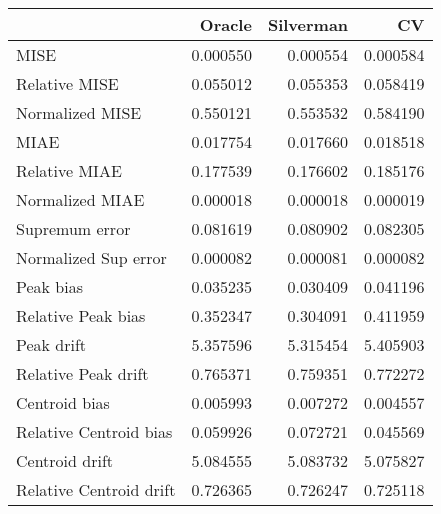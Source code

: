 \begin{tabular}{lrrr}
  \toprule
 & Oracle & Silverman & CV \\ 
  \midrule
MISE & 0.000550 & 0.000554 & 0.000584 \\ 
  Relative MISE & 0.055012 & 0.055353 & 0.058419 \\ 
  Normalized MISE & 0.550121 & 0.553532 & 0.584190 \\ 
  MIAE & 0.017754 & 0.017660 & 0.018518 \\ 
  Relative MIAE & 0.177539 & 0.176602 & 0.185176 \\ 
  Normalized MIAE & 0.000018 & 0.000018 & 0.000019 \\ 
  Supremum error & 0.081619 & 0.080902 & 0.082305 \\ 
  Normalized Sup error & 0.000082 & 0.000081 & 0.000082 \\ 
  Peak bias & 0.035235 & 0.030409 & 0.041196 \\ 
  Relative Peak bias & 0.352347 & 0.304091 & 0.411959 \\ 
  Peak drift & 5.357596 & 5.315454 & 5.405903 \\ 
  Relative Peak drift & 0.765371 & 0.759351 & 0.772272 \\ 
  Centroid bias & 0.005993 & 0.007272 & 0.004557 \\ 
  Relative Centroid bias & 0.059926 & 0.072721 & 0.045569 \\ 
  Centroid drift & 5.084555 & 5.083732 & 5.075827 \\ 
  Relative Centroid drift & 0.726365 & 0.726247 & 0.725118 \\ 
   \bottomrule
\end{tabular}
